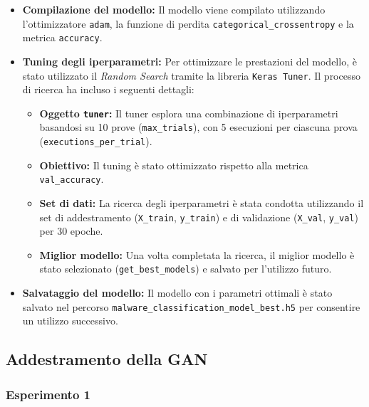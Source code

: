 \begin{itemize}
    \item \textbf{Compilazione del modello:} 
    Il modello viene compilato utilizzando l'ottimizzatore \texttt{adam}, la funzione di perdita \texttt{categorical\_crossentropy} e la metrica \texttt{accuracy}.

    \item \textbf{Tuning degli iperparametri:} 
    Per ottimizzare le prestazioni del modello, è stato utilizzato il \textit{Random Search} tramite la libreria \texttt{Keras Tuner}. Il processo di ricerca ha incluso i seguenti dettagli:
    \begin{itemize}
        \item \textbf{Oggetto \texttt{tuner}:} Il tuner esplora una combinazione di iperparametri basandosi su 10 prove (\texttt{max\_trials}), con 5 esecuzioni per ciascuna prova (\texttt{executions\_per\_trial}).
        \item \textbf{Obiettivo:} Il tuning è stato ottimizzato rispetto alla metrica \texttt{val\_accuracy}.
        \item \textbf{Set di dati:} La ricerca degli iperparametri è stata condotta utilizzando il set di addestramento (\texttt{X\_train}, \texttt{y\_train}) e di validazione (\texttt{X\_val}, \texttt{y\_val}) per 30 epoche.
        \item \textbf{Miglior modello:} Una volta completata la ricerca, il miglior modello è stato selezionato (\texttt{get\_best\_models}) e salvato per l'utilizzo futuro.
    \end{itemize}

    \item \textbf{Salvataggio del modello:} 
    Il modello con i parametri ottimali è stato salvato nel percorso \texttt{malware\_classification\_model\_best.h5} per consentire un utilizzo successivo.
\end{itemize}


\subsection{Addestramento della GAN}

\subsubsection{Esperimento 1}

